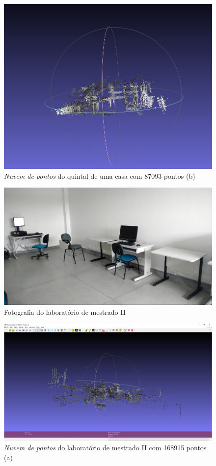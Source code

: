 \begin{figure}[H]
	\centering
		\includegraphics[width= \textwidth]{Imagens/figura4-11.jpg}
	\caption{\textit{Nuvem de pontos} do quintal de uma casa com 87093 pontos (b)}
	\label{fig4:11}
\end{figure}

\begin{figure}[H]
	\centering
		\includegraphics[width= \textwidth]{Imagens/figura4-15.jpg}
	\caption{Fotografia do laboratório de mestrado II}
	\label{fig4:15}
\end{figure}

\begin{figure}[H]
	\centering
		\includegraphics[width= \textwidth]{Imagens/figura4-13.jpg}
	\caption{\textit{Nuvem de pontos} do laboratório de mestrado II com 168915 pontos (a)}
	\label{fig4:13}
\end{figure}

